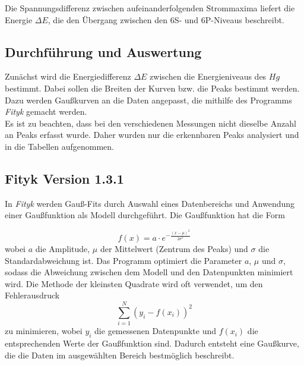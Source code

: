 \documentclass{article}
\begin{document}
\begin{multicols}{2}
Die Spannungsdifferenz zwischen aufeinanderfolgenden Strommaxima liefert die Energie $\Delta E$, die den 
Übergang zwischen den 6S- und 6P-Niveaus beschreibt. 
\subsection{Durchführung und Auswertung}
Zunächst wird die Energiedifferenz $\Delta E$ zwischen die Energieniveaus des $Hg$ bestimmt. 
Dabei sollen die Breiten der Kurven bzw. die Peaks bestimmt werden. Dazu werden Gaußkurven an die Daten angepasst,
die mithilfe des Programms \textit{Fityk} gemacht werden.
\\ Es ist zu beachten, dass bei den verschiedenen Messungen nicht dieselbe Anzahl an Peaks 
erfasst wurde. Daher wurden nur die erkennbaren Peaks analysiert und in die Tabellen 
aufgenommen. 
\subsection*{Fityk Version 1.3.1}
In \textit{Fityk} werden Gauß-Fits durch Auswahl eines Datenbereichs und Anwendung einer Gaußfunktion als 
Modell durchgeführt. Die Gaußfunktion hat die Form 

\begin{equation*}
f(x) = a \cdot e^{-\frac{(x - \mu)^2}{2 \sigma^2}}
\end{equation*}
wobei $a$ die Amplitude, $\mu$ der Mittelwert (Zentrum des Peaks) und $\sigma$ die Standardabweichung 
ist. Das Programm optimiert die Parameter $a$, $\mu$ und $\sigma$, sodass die Abweichung zwischen dem Modell 
und den Datenpunkten minimiert wird. Die Methode der kleinsten Quadrate wird oft verwendet, um den
 Fehlerausdruck
\begin{equation*}
\sum_{i=1}^{N} (y_i - f(x_i))^2
\end{equation*}
zu minimieren, wobei $y_i$ die gemessenen Datenpunkte und $f(x_i)$ die entsprechenden Werte der Gaußfunktion 
sind. Dadurch entsteht eine Gaußkurve, die die Daten im ausgewählten Bereich bestmöglich beschreibt.

\end{multicols}
\end{document}
